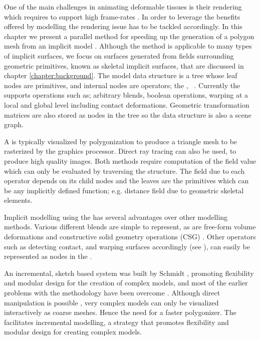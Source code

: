 \label{chapter:cpuPoly}
One of the main challenges in animating deformable tissues is their rendering which requires to support high frame-rates \cite{Shirazian2012}. 
In order to leverage the benefits offered by \blob modelling the rendering issue has to be tackled accordingly. In this chapter
we present a parallel method for speeding up the generation of a polygon mesh from an implicit model \cite{Shirazian2012}. Although the method is applicable 
to many types of implicit surfaces, we focus on surfaces generated from fields surrounding geometric  primitives,  known as skeletal implicit 
surfaces,  \cite{Bloomenthal1997} that are discussed in chapter \ref{chapter:background}. The model data structure is a tree whose leaf nodes 
are primitives, and internal nodes are operators;  the \blobns, ~\cite{Wyvill1999}.
Currently the \blob supports operations such as;  arbitrary blends, boolean operations, warping at a local and global level including contact deformations. 
Geometric transformation matrices are also stored as nodes in the tree so the data structure is also a scene graph. 

A \blob  is typically visualized by  polygonization to produce a triangle mesh to be
rasterized by the graphics processor.  Direct ray tracing  \cite{Bloomenthal1997} can also be used,
to produce high quality images.  Both methods require computation of the field value which can 
only be evaluated by traversing the \blob structure. The field due to each operator depends 
on its child nodes and the leaves are the primitives which can be any implicitly defined function; 
e.g. distance field due to geometric skeletal elements.

Implicit  modelling using the \blob has several advantages  over other modelling methods.  Various different blends are simple to represent, 
as are free-form volume deformations and constructive solid geometry operations  (CSG) \cite{gomes2009implicit}. Other operators 
 such as detecting contact, and warping surfaces accordingly (see  \cite{Grascuel1997}),  can easily be represented as nodes in the \blobns. 

 An incremental, sketch based \blob system was built by Schmidt \etal \cite{Schmidt2006}, promoting flexibility and modular design for the creation of complex models, 
and most of the earlier problems with the methodology have been overcome \cite{Bernhardt2010}. Although direct manipulation 
is possible  \cite{Schmidt2006},  very complex models can only be visualized interactively as coarse meshes. 
Hence the need for a faster polygonizer. The \blob facilitates incremental modelling, a strategy that promotes flexibility and modular design 
for creating  complex models. 

